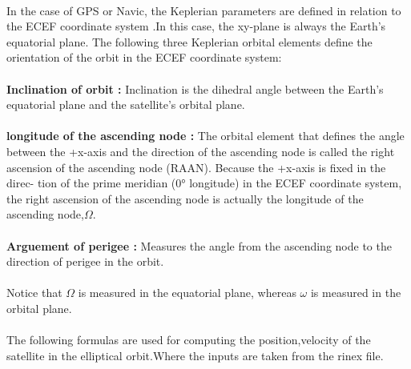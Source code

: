 \documentclass[journal,15pt,twocolumn]{IEEEtran}
\begin{document}
 \\
 In the case of GPS or Navic, the Keplerian
parameters are defined in relation to the ECEF coordinate system .In this case, the xy-plane is always the Earth's equatorial plane.
The following three Keplerian orbital elements define the orientation of the orbit in the
ECEF coordinate system:\\
\\
\textbf{Inclination of orbit :} Inclination is the dihedral angle between the Earth’s equatorial plane and the
satellite’s orbital plane.\\
\\
\textbf{longitude of the ascending node :} The orbital element that defines the
angle between the +x-axis and the direction of the ascending node is called the right
ascension of the ascending node (RAAN). Because the +x-axis is fixed in the direc-
tion of the prime meridian (0° longitude) in the ECEF coordinate system, the right
ascension of the ascending node is actually the longitude of the ascending node,$\Omega$.\\
\\
\textbf{Arguement of perigee :} Measures the angle
from the ascending node to the direction of perigee in the orbit. \\
\\
Notice that $\Omega$ is measured in the equatorial plane, whereas $\omega$ is measured in the orbital plane.
\\
\\
The following formulas are used for computing the position,velocity of the satellite in the elliptical orbit.Where the inputs are taken from the rinex file.\\
\end{document}
